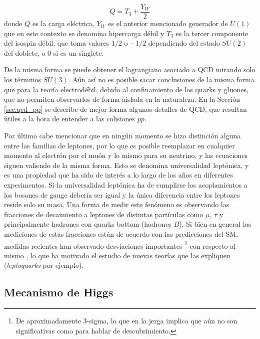 \begin{equation}
Q = T_3 + \frac{Y_W}{2} 
\end{equation}
\useshortskip
%
donde $Q$ es la carga eléctrica, $Y_W$ es el anterior mencionado generador de $U(1)$ que en este contexto se denomina hipercarga débil y $T_3$ es la tercer componente del isospin débil, que toma valores $1/2$ o $-1/2$ dependiendo del estado $SU(2)$ del doblete, o $0$ si es un singlete.

De la misma forma se puede obtener el lagrangiano asociado a QCD mirando solo los términos $SU(3)$. Aún así no es posible sacar conclusiones de la misma forma que para la teoría electrodébil, debido al confinamiento de los quarks y gluones, que no permiten observarlos de forma aislada en la naturaleza. En la Sección \ref{sec:qcd_pp} se describe de mejor forma algunos detalles de QCD, que resultan útiles a la hora de entender a las colisiones $pp$.

Por último cabe mencionar que en ningún momento se hizo distinción alguna entre las familias de leptones, por lo que es posible reemplazar en cualquier momento al electrón por el muón y lo mismo para su neutrino, y las ecuaciones siguen valiendo de la misma forma. Esto se denomina universalidad leptónica, y es una propiedad que ha sido de interés a lo largo de los años en diferentes experimentos. Si la universalidad leptónica ha de cumplirse los acoplamientos a los bosones de gauge debería ser igual y la única diferencia entre los leptones reside solo su masa. Una forma de medir este fenómeno es observando las fracciones de decaimiento a leptones de distintas partículas como $\mu$, $\tau$ y principalmente hadrones con quarks bottom (hadrones $B$). Si bien en general las mediciones de estas fracciones están de acuerdo con las predicciones del SM, medidas recientes han observado desviaciones importantes \footnote{De aproximadamente 3-sigma, lo que en la jerga implica que aún no son significativas como para hablar de descubrimiento.} con respecto al mismo \cite{lepton_uni_1, lepton_uni_2}, lo que ha motivado el estudio de nuevas teorías que las expliquen (\textit{leptoquarks} por ejemplo).


\subsection{Mecanismo de Higgs}

